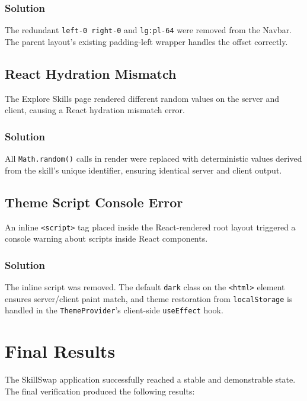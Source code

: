 \documentclass[12pt,a4paper]{report}
\begin{document}
\subsection{Solution}
The redundant \texttt{left-0 right-0} and \texttt{lg:pl-64} were removed from
the Navbar.  The parent layout's existing padding-left wrapper handles the
offset correctly.

\section{React Hydration Mismatch}
The Explore Skills page rendered different random values on the server and
client, causing a React hydration mismatch error.

\subsection{Solution}
All \texttt{Math.random()} calls in render were replaced with deterministic
values derived from the skill's unique identifier, ensuring identical server and
client output.

\section{Theme Script Console Error}
An inline \texttt{<script>} tag placed inside the React-rendered root layout
triggered a console warning about scripts inside React components.

\subsection{Solution}
The inline script was removed.  The default \texttt{dark} class on the
\texttt{<html>} element ensures server/client paint match, and theme
restoration from \texttt{localStorage} is handled in the \texttt{ThemeProvider}'s
client-side \texttt{useEffect} hook.

\chapter{Final Results}

The SkillSwap application successfully reached a stable and demonstrable state.
The final verification produced the following results:
\end{document}
